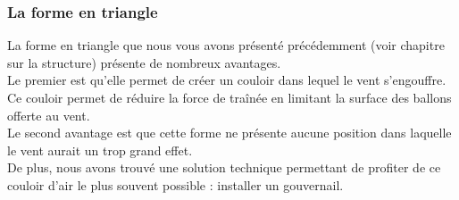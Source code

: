 \documentclass[a4paper,11pt]{article}
\begin{document}
\subsubsection{La forme en triangle}
	La forme en triangle que nous vous avons présenté précédemment (voir chapitre sur la structure) présente de nombreux avantages.
	\\
	Le premier est qu'elle permet de créer un couloir dans lequel le vent s'engouffre. Ce couloir permet de réduire la force de traînée en limitant la surface des ballons offerte au vent. \\
	Le second avantage est que cette forme ne présente aucune position dans laquelle le vent aurait un trop grand effet.\\
	De plus, nous avons trouvé une solution technique permettant de profiter de ce couloir d'air le plus souvent possible : installer un gouvernail.
\end{document}
